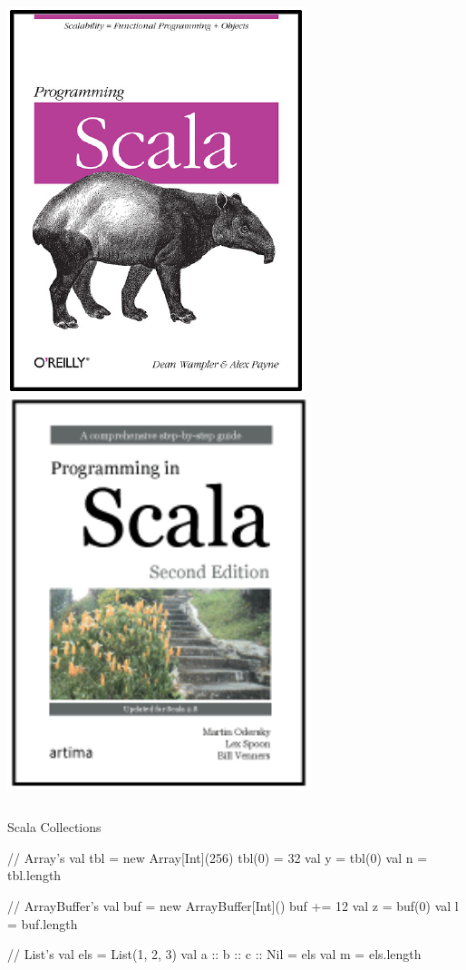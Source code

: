 \documentclass[xcolor=pdflatex,dvipsnames,table]{beamer}
\begin{document}
\begin{frame}[fragile]
\begin{columns}[c]
\begin{center}
\includegraphics[height=0.4\textheight]{../bootcamp/figs/programming-scala.pdf} \\
\includegraphics[height=0.4\textheight]{../bootcamp/figs/programming-in-scala.pdf}
\end{center}

\end{columns}
\end{frame}

\begin{frame}[fragile]{Scala Collections}
\begin{scala}
// Array's
val tbl = new Array[Int](256)
tbl(0) = 32
val y = tbl(0)
val n = tbl.length

// ArrayBuffer's
val buf = new ArrayBuffer[Int]()
buf += 12
val z = buf(0)
val l = buf.length

// List's
val els = List(1, 2, 3)
val a :: b :: c :: Nil = els
val m = els.length
\end{scala}
\end{frame}
\end{document}

